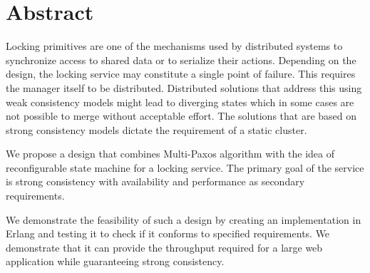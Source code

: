 \chapter{Abstract}

Locking primitives are one of the mechanisms used by distributed systems
to synchronize access to shared data or to serialize their actions. Depending
on the design, the locking service may constitute
a single point of failure. This requires the manager itself to be
distributed. Distributed solutions that address this using weak consistency
models might lead to diverging states which in some cases are not possible to
merge without acceptable effort. The solutions that are based on strong
consistency models dictate the requirement of a static cluster.

We propose a design that combines Multi-Paxos algorithm with the idea of
reconfigurable state machine for a locking service. The primary goal of
the service is strong consistency with availability and performance as
secondary requirements.

We demonstrate the feasibility of such a design by creating an implementation
in Erlang and testing it to check if it conforms to specified requirements.
We demonstrate that it can provide the throughput required for a large
web application while guaranteeing strong consistency.
